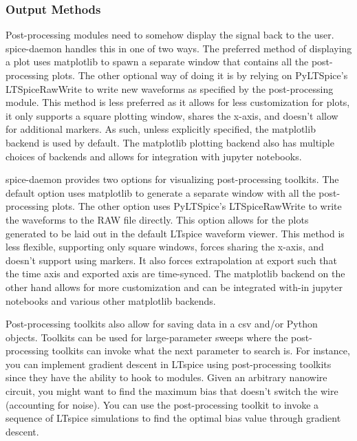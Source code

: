 \documentclass[]{article}
\newcommand{\todo}[2][]{}
\newcommand{\cf}[1]{\textsf{#1}}
\begin{document}
\todo[inline]{example of a PSD to replicate noise input}

\subsubsection{Output Methods}

Post-processing modules need to somehow display the signal back to the user. spice-daemon handles this
in one of two ways. The preferred method of displaying a plot uses matplotlib to spawn a separate window
that contains all the post-processing plots. The other optional way of doing it is by relying on 
\cf{PyLTSpice}'s \cf{LTSpiceRawWrite} to write new waveforms as specified by the post-processing module.
This method is less preferred as it allows for less customization for plots, it only supports a square
plotting window, shares the x-axis, and doesn't allow for additional markers. As such, unless explicitly
specified, the matplotlib backend is used by default. The matplotlib plotting backend also has multiple 
choices of backends and allows for integration with jupyter notebooks. 

spice-daemon provides two options for visualizing post-processing toolkits. The default
option uses \cf{matplotlib} to generate a separate window with all the post-processing
plots. The other option uses \cf{PyLTSpice}'s \cf{LTSpiceRawWrite} to write the waveforms
to the RAW file directly. This option allows for the plots generated to be laid out in the
default LTspice waveform viewer. This method is less flexible, supporting only square 
windows, forces sharing the x-axis, and doesn't support using markers. It also forces
extrapolation at export such that the time axis and exported axis are time-synced.
The \cf{matplotlib} backend on the other hand allows for more customization and 
can be integrated with-in jupyter notebooks and various other \cf{matplotlib} backends.

Post-processing toolkits also allow for saving data in a csv and/or Python objects. 
Toolkits can be used for large-parameter sweeps where the post-processing toolkits
can invoke what the next parameter to search is. For instance, you can implement
gradient descent in LTspice using post-processing toolkits since they have the ability
to hook to modules. Given an arbitrary nanowire circuit, you might want to find the
maximum bias that doesn't switch the wire (accounting for noise). You can use 
the post-processing toolkit to invoke a sequence of LTspice simulations to find
the optimal bias value through gradient descent.
\end{document}
